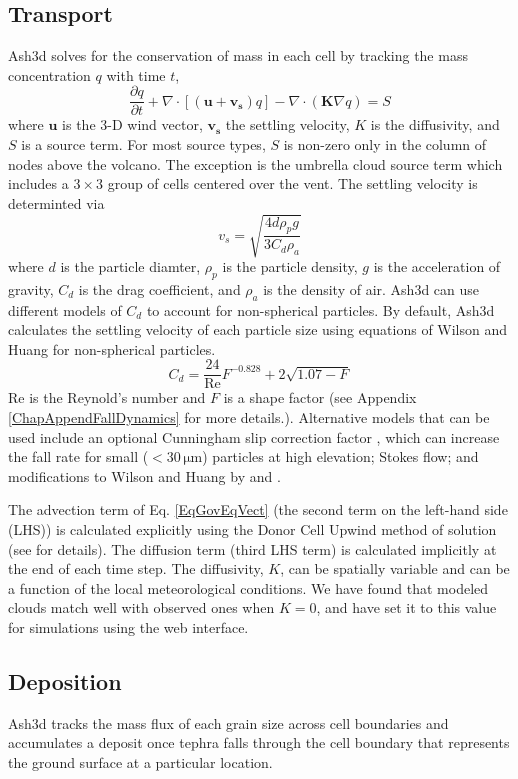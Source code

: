 \subsection{Transport}\label{ChapIntroSecTrans}
Ash3d solves for the conservation of mass in each cell by tracking the mass
concentration $q$ with time $t$,
\begin{equation}\label{EqGovEqVect}
 \frac{\partial q}{\partial t} +
   \nabla \cdot \left[ \left(\mathbf{u} + \mathbf{v_s} \right) q \right]
 - \nabla \cdot \left( \mathbf{K} \nabla q\right) = S
\end{equation}
where $\mathbf{u}$ is the 3-D wind vector,
$\mathbf{v_s}$ the settling velocity, $K$ is the
diffusivity, and $S$ is a source term.  For most source types, $S$
is non-zero only in the column of nodes above the volcano.  The
exception is the umbrella cloud source term which includes a
$3 \times 3$ group of cells centered over the vent.
The settling velocity is determinted via \cite[p.182]{Bird60}
\begin{equation}
v_s=\sqrt{\frac{4d\rho_p g}{3C_d\rho_a}}\label{EqFallVel}
\end{equation}
where $d$ is the particle diamter, $\rho_p$ is the particle density, $g$ is
the acceleration of gravity, $C_d$ is the drag coefficient, and $\rho_a$
is the density of air.
Ash3d can use different models of $C_d$ to account for non-spherical particles.
By default, Ash3d calculates the settling
velocity of each particle size using equations of Wilson and Huang \cite{Wilson79}
for non-spherical particles.
\begin{equation}
C_d = \frac{24}{\mathrm{Re}}F^{-0.828}+2 \sqrt{1.07-F}\label{EqDragWH}
\end{equation}
$\mathrm{Re}$ is the Reynold's number and $F$ is a shape factor (see
Appendix \ref{ChapAppendFallDynamics} for more details.).
Alternative models that can be used include an
optional Cunningham slip correction factor \cite[p.407]{Seinfeld06},
which can increase the fall rate for small ($<30 \,\mathrm{\mu m}$)
particles at high elevation;
Stokes flow; and modifications to Wilson and Huang by \cite{Ganser93} and
\cite{Pfeiffer05}.

The advection term of Eq. \ref{EqGovEqVect} (the second term on the left-hand side
(LHS)) is calculated explicitly using the Donor Cell Upwind method of
solution (see \cite{Schwaiger12} for details). The diffusion term (third
LHS term) is calculated implicitly at the end of each time step. The diffusivity,
$K$, can be spatially variable and can be a function of the local meteorological
conditions. We have found that modeled clouds match well with observed ones
when $K=0$, and have set it to this value for simulations using the web interface.

\subsection{Deposition}\label{ChapIntroSecDepo}
Ash3d tracks the mass flux of each grain size across cell boundaries and
accumulates a deposit once tephra falls through the cell boundary that
represents the ground surface at a particular location.

